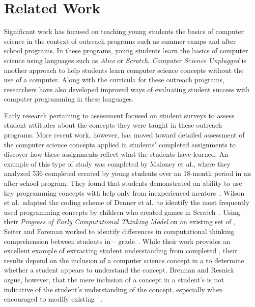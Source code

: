 \section{Related Work}
Significant work has focused on teaching young students the basics of computer
science in the context of outreach programs such as summer camps and after
school programs. In these programs, young students learn the basics of computer
science using languages such as \emph{Alice} or \emph{Scratch}. \emph{Computer
  Science Unplugged} is another approach to help students learn computer
science concepts without the use of a computer. Along with the curricula for
these outreach programs, researchers have also developed improved ways of
evaluating student success with computer programming in these languages.

Early research pertaining to assessment focused on student surveys to assess
student attitudes about the concepts they were taught in these outreach
programs. More recent work, however, has moved toward detailed assessment of
the computer science concepts applied in students' completed assignments to
discover how these assignments reflect what the students have learned. An
example of this type of study was completed by Maloney et al., where they
analyzed 536 completed  created by young students over an 18-month
period in an after school program. They found that students demonstrated an
ability to use key programming concepts with help only from inexperienced
mentors~\cite{Maloney:2008:PCU:1352135.1352260}. Wilson et al.\ adapted the
coding scheme of Denner et al.\ to identify the most frequently used
programming concepts by children who created games in
Scratch~\cite{Denner:2012:CGC:2072695.2073050, wilson12}. Using their
\emph{Progress of Early Computational Thinking Model} on an existing set of
, Seiter and Foreman worked to identify differences in
computational thinking comprehension between students in --
grade~\cite{Seiter:2013:MLP:2493394.2493403}. While their work provides an
excellent example of extracting student understanding from completed
, their results depend on the inclusion of a computer science
concept in a \sprogram{} to determine whether a student appears to understand
the concept. Brennan and Resnick argue, however, that the mere inclusion of a
concept in a student's \sprogram{} is not indicative of the student's
understanding of the concept, especially when encouraged to modify existing
~\cite{brennan12}.


